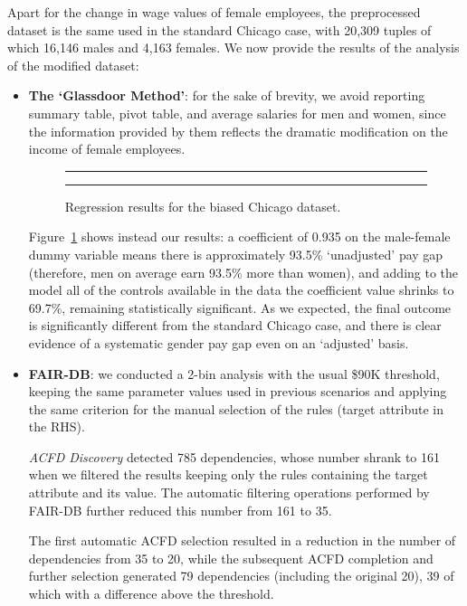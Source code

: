 Apart for the change in wage values of female employees, the preprocessed dataset is the same used in the standard Chicago case, with 20,309 tuples of which 16,146 males and 4,163 females. We now provide the results of the analysis of the modified dataset:
\begin{itemize}
\item \textbf{The `Glassdoor Method'}: for the sake of brevity, we avoid reporting summary table, pivot table, and average salaries for men and women, since the information provided by them reflects the dramatic modification on the income of female employees.

\begin{figure}[t!]
\centering
\noindent\rule{\linewidth}{0.4pt}\par
\noindent\rule{\linewidth}{0.4pt}
\caption{Regression results for the biased Chicago dataset.}
\label{fig:chicago_biased_glassdoor}
\end{figure}

Figure~\ref{fig:chicago_biased_glassdoor} shows instead our results: a coefficient of 0.935 on the male-female dummy variable means there is approximately 93.5\% `unadjusted' pay gap (therefore, men on average earn 93.5\% more than women), and adding to the model all of the controls available in the data the coefficient value shrinks to 69.7\%, remaining statistically significant. As we expected, the final outcome is significantly different from the standard Chicago case, and there is clear evidence of a systematic gender pay gap even on an `adjusted' basis.
\item \textbf{FAIR-DB}: we conducted a 2-bin analysis with the usual \$90K threshold, keeping the same parameter values used in previous scenarios and applying the same criterion for the manual selection of the rules (target attribute in the RHS).

\textit{ACFD Discovery} detected 785 dependencies, whose number shrank to 161 when we filtered the results keeping only the rules containing the target attribute and its value. The automatic filtering operations performed by FAIR-DB further reduced this number from 161 to 35.

The first automatic ACFD selection resulted in a reduction in the number of dependencies from 35 to 20, while the subsequent ACFD completion and further selection generated 79 dependencies (including the original 20), 39 of which with a difference above the threshold.


\end{itemize}
